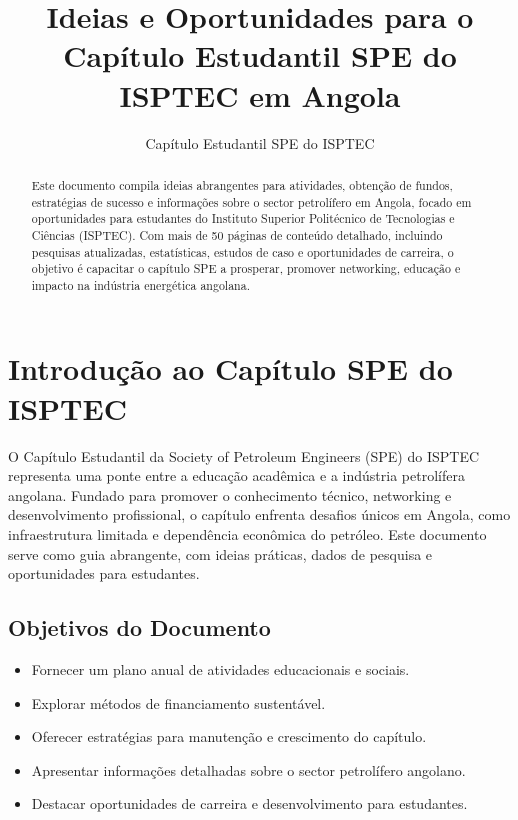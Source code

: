 \documentclass[12pt]{article}
\title{Ideias e Oportunidades para o Capítulo Estudantil SPE do ISPTEC em Angola}
\author{Capítulo Estudantil SPE do ISPTEC}
\date{}
\begin{document}
\maketitle

\begin{abstract}
Este documento compila ideias abrangentes para atividades, obtenção de fundos, estratégias de sucesso e informações sobre o sector petrolífero em Angola, focado em oportunidades para estudantes do Instituto Superior Politécnico de Tecnologias e Ciências (ISPTEC). Com mais de 50 páginas de conteúdo detalhado, incluindo pesquisas atualizadas, estatísticas, estudos de caso e oportunidades de carreira, o objetivo é capacitar o capítulo SPE a prosperar, promover networking, educação e impacto na indústria energética angolana.
\end{abstract}

\newpage

\section{Introdução ao Capítulo SPE do ISPTEC}

O Capítulo Estudantil da Society of Petroleum Engineers (SPE) do ISPTEC representa uma ponte entre a educação acadêmica e a indústria petrolífera angolana. Fundado para promover o conhecimento técnico, networking e desenvolvimento profissional, o capítulo enfrenta desafios únicos em Angola, como infraestrutura limitada e dependência econômica do petróleo. Este documento serve como guia abrangente, com ideias práticas, dados de pesquisa e oportunidades para estudantes.

\subsection{Objetivos do Documento}
\begin{itemize}
    \item Fornecer um plano anual de atividades educacionais e sociais.
    \item Explorar métodos de financiamento sustentável.
    \item Oferecer estratégias para manutenção e crescimento do capítulo.
    \item Apresentar informações detalhadas sobre o sector petrolífero angolano.
    \item Destacar oportunidades de carreira e desenvolvimento para estudantes.
\end{itemize}
\end{document}

